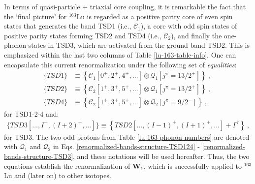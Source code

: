 In terms of quasi-particle + triaxial core coupling, it is remarkable the fact that the `final picture' for $^{163}$Lu is regarded as a positive parity core of even spin states that generates the band TSD1 (i.e., $\mathscr{C}_1$), a core with odd spin states of positive parity states forming TSD2 and TSD4 (i.e., $\mathscr{C}_2$), and finally the one-phonon states in TSD3, which are activated from the ground band TSD2. This is emphasized within the last two columns of Table \ref{lu-163-table-info}. One can encapsulate this current renormalization under the following set of \emph{equalities}:
\begin{align}
    \{TSD1\}&\equiv\left\{\mathscr{C}_1\left[0^+,2^+,4^+,\dots\right] \otimes \mathcal{Q}_1[j^\pi=13/2^+]\right\}\ ,\ \nonumber\\
    \{TSD2\}&\equiv\left\{\mathscr{C}_2\left[1^+,3^+,5^+,\dots\right] \otimes \mathcal{Q}_1[j^\pi=13/2^+]\right\}\ ,\ \nonumber\\
    \{TSD4\}&\equiv\left\{\mathscr{C}_2\left[1^+,3^+,5^+,\dots\right] \otimes \mathcal{Q}_2[j^\pi=9/2^-]\right\}\ ,
    \label{renormalized-bands-structure-TSD124}
\end{align}
for TSD1-2-4 and:
\begin{align}
    \{TSD3\left[\dots,I^+,(I+2)^+,\dots\right]\}\equiv\left\{TSD2\left[\dots,(I-1)^+,(I+1)^+,\dots\right]+\Gamma^\dagger\right\}\ ,
    \label{renormalized-bands-structure-TSD3}
\end{align}
for TSD3. The two odd protons from Table \ref{lu-163-phonon-numbers} are denoted with $\mathcal{Q}_1$ and $\mathcal{Q}_2$ in Eqs. \ref{renormalized-bands-structure-TSD124} - \ref{renormalized-bands-structure-TSD3}, and these notations will be used hereafter. Thus, the two equations establish the renormalization of $\mathbf{W_1}$, which is successfully applied to $^{163}$Lu and (later on) to other isotopes.%

